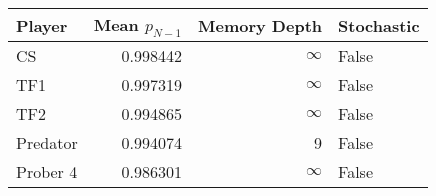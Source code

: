 \begin{tabular}{lrrl}
\toprule
   Player &  Mean $p_{N-1}$ &  Memory Depth & Stochastic \\
\midrule
       CS &        0.998442 &            \(\infty\) &      False \\
      TF1 &        0.997319 &            \(\infty\) &      False \\
      TF2 &        0.994865 &            \(\infty\) &      False \\
 Predator &        0.994074 &             9 &      False \\
 Prober 4 &        0.986301 &            \(\infty\) &      False \\
\bottomrule
\end{tabular}
